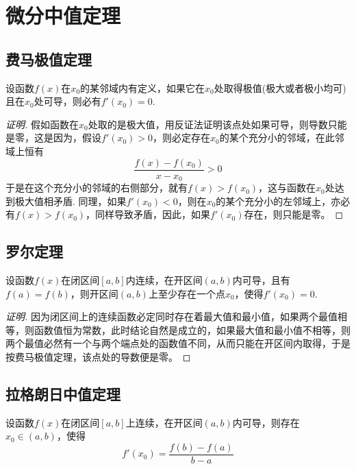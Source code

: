 
\section{微分中值定理}
\label{sec:differential-mean-value-theorems}

\subsection{费马极值定理}
\label{sec:fermat-limit-value-theorem}

\begin{theorem}
  设函数$f(x)$在$x_0$的某邻域内有定义，如果它在$x_0$处取得极值(极大或者极小均可)且在$x_0$处可导，则必有$f'(x_0)=0$.
\end{theorem}

\begin{proof}[证明]
  假如函数在$x_0$处取的是极大值，用反证法证明该点处如果可导，则导数只能是零，这是因为，假设$f'(x_0)>0$，则必定存在$x_0$的某个充分小的邻域，在此邻域上恒有
  \[ \frac{f(x)-f(x_0)}{x-x_0} > 0 \]
  于是在这个充分小的邻域的右侧部分，就有$f(x)>f(x_0)$，这与函数在$x_0$处达到极大值相矛盾. 同理，如果$f'(x_0)<0$，则在$x_0$的某个充分小的左邻域上，亦必有$f(x)>f(x_0)$，同样导致矛盾，因此，如果$f'(x_0)$存在，则只能是零。
\end{proof}


\subsection{罗尔定理}
\label{sec:rolle-theorem}

\begin{theorem}[罗尔(Rolle)定理]
  设函数$f(x)$在闭区间$[a,b]$内连续，在开区间$(a,b)$内可导，且有$f(a)=f(b)$，则开区间$(a,b)$上至少存在一个点$x_0$，使得$f'(x_0)=0$.
\end{theorem}

\begin{proof}[证明]
  因为闭区间上的连续函数必定同时存在着最大值和最小值，如果两个最值相等，则函数值恒为常数，此时结论自然是成立的，如果最大值和最小值不相等，则两个最值必然有一个与两个端点处的函数值不同，从而只能在开区间内取得，于是按费马极值定理，该点处的导数便是零。
\end{proof}

\subsection{拉格朗日中值定理}
\label{sec:lagrange-middle-value-theorem}

\begin{theorem}
  设函数$f(x)$在闭区间$[a,b]$上连续，在开区间$(a,b)$内可导，则存在$x_0 \in (a,b)$，使得
  \[ f'(x_0) = \frac{f(b)-f(a)}{b-a} \]
\end{theorem}

